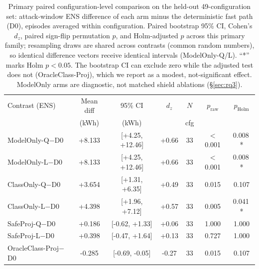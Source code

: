 \begin{table}[t]
\centering\small
\caption{Primary paired configuration-level comparison on the held-out
49-configuration set: attack-window ENS difference of each arm minus the
deterministic fast path (D0), episodes averaged within configuration. Paired
bootstrap 95\% CI, Cohen's $d_z$, paired sign-flip permutation $p$, and
Holm-adjusted $p$ across this primary family; resampling draws are shared
across contrasts (common random numbers), so identical difference vectors
receive identical intervals (ModelOnly-Q/L). ``*'' marks Holm $p<0.05$. The
bootstrap CI can exclude zero while the adjusted test does not (OracleClass-Proj),
which we report as a modest, not-significant effect. ModelOnly arms are
diagnostic, not matched shield ablations (\S\ref{sec:rq3}).}
\label{tab:stats-primary}
\begin{tabular}{lcccccc}
\toprule
Contrast (ENS) & Mean diff & 95\% CI & $d_z$ & $N$ & $p_{\text{raw}}$ & $p_{\text{Holm}}$ \\
 & (kWh) & (kWh) & & cfg & & \\
\midrule
ModelOnly-Q$-$D0 & +8.133 & [+4.25, +12.46] & +0.66 & 33 & $<$0.001 & 0.008\,* \\
ModelOnly-L$-$D0 & +8.133 & [+4.25, +12.46] & +0.66 & 33 & $<$0.001 & 0.008\,* \\
ClassOnly-Q$-$D0 & +3.654 & [+1.31, +6.35] & +0.49 & 33 & 0.015 & 0.107 \\
ClassOnly-L$-$D0 & +4.398 & [+1.96, +7.12] & +0.57 & 33 & 0.005 & 0.041\,* \\
SafeProj-Q$-$D0 & +0.186 & [-0.62, +1.33] & +0.06 & 33 & 1.000 & 1.000 \\
SafeProj-L$-$D0 & +0.398 & [-0.47, +1.64] & +0.13 & 33 & 0.727 & 1.000 \\
OracleClass-Proj$-$D0 & -0.285 & [-0.69, -0.05] & -0.27 & 33 & 0.015 & 0.107 \\
\bottomrule
\end{tabular}
\end{table}
